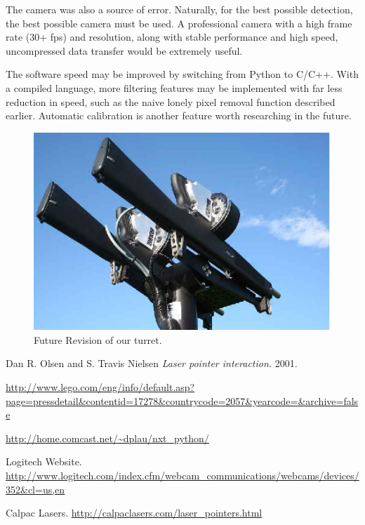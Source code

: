 \documentclass[10pt,twocolumn,letterpaper]{article}
\begin{document}
The camera was also a source of error.  Naturally, for the best possible detection, the best possible camera must be used.  A professional camera with a high frame rate (30+ fps) and resolution, along with stable performance and high speed, uncompressed data transfer would be extremely useful.

The software speed may be improved by switching from Python to C/C++.  With a compiled language, more filtering features may be implemented with far less reduction in speed, such as the naive lonely pixel removal function described earlier.  Automatic calibration is another feature worth researching in the future.

\begin{figure}[t]
\begin{center}
  \includegraphics[width=0.8\linewidth]{hammer_069_a.eps}
\end{center}
   \caption{Future Revision of our turret.}
\label{fig:long}
\label{fig:onecol}
\end{figure}

\begin{thebibliography}{1}

   Dan R. Olsen and S. Travis Nielsen {\em Laser pointer interaction.} 2001. 

   \url{http://www.lego.com/eng/info/default.asp?page=pressdetail&contentid=17278&countrycode=2057&yearcode=&archive=false}

   \url{http://home.comcast.net/~dplau/nxt\_python/}
  
	 Logitech Website. \url{http://www.logitech.com/index.cfm/webcam\_communications/webcams/devices/352&cl=us,en}

   Calpac Lasers. \url{http://calpaclasers.com/laser\_pointers.html}

 \end{thebibliography}

{\small


}
\end{document}
